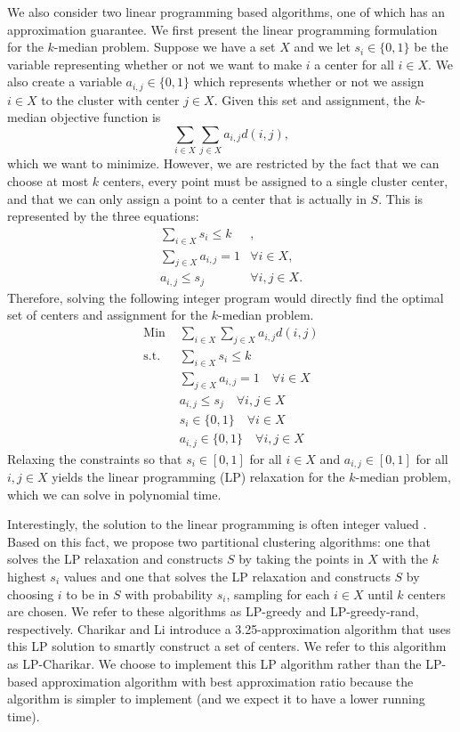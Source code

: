 \documentclass[conference, 10pt, final]{IEEEtran}
\begin{document}
We also consider two linear programming based algorithms, one of which has an approximation guarantee. We first present the linear programming formulation for the $k$-median problem. Suppose we have a set $X$ and we let $s_i \in \{0,1\}$ be the variable representing whether or not we want to make $i$ a center for all $i \in X$. We also create a variable $a_{i,j} \in \{0, 1\}$ which represents whether or not we assign $i \in X$ to the cluster with center $j \in X$. Given this set and assignment, the $k$-median objective function is 
\begin{equation}
\sum_{i \in X} \sum_{j \in X} a_{i,j} d(i,j), 
\end{equation}
which we want to minimize. However, we are restricted by the fact that we can choose at most $k$ centers, every point must be assigned to a single cluster center, and that we can only assign a point to a center that is actually in $S$. This is represented by the three equations:
\begin{eqnarray}
\sum_{i \in X} s_i   \leq k & ,\\
\sum_{j \in X} a_{i,j}  = 1 & \forall i \in X, \\
a_{i,j}   \leq s_j & \forall i, j \in X.
\end{eqnarray}
Therefore, solving the following integer program would directly find the optimal set of centers and assignment for the $k$-median problem.
\begin{eqnarray}
\text{Min } & \sum_{i \in X} \sum_{j \in X} a_{i,j} d(i,j) \\
\text{s.t. } & \sum_{i \in X} s_i   \leq k  \\
& \sum_{j \in X} a_{i,j}  = 1 \quad \forall i \in X \\
& a_{i,j}   \leq s_j \quad \forall i, j \in X \\
& s_i \in \{0,1\} \quad \forall i \in X \\
& a_{i,j} \in \{0,1\} \quad \forall i, j \in X
\end{eqnarray}
Relaxing the constraints so that $s_i \in [0,1]$ for all $i \in X$ and $a_{i,j} \in [0,1]$ for all $i,j \in X$ yields the linear programming (LP) relaxation for the $k$-median problem, which we can solve in polynomial time.

Interestingly, the solution to the linear programming is often integer valued \cite{Nagarajan}. Based on this fact, we propose two partitional clustering algorithms: one that solves the LP relaxation and constructs $S$ by taking the points in $X$ with the $k$ highest $s_i$ values and one that solves the LP relaxation and constructs $S$ by choosing $i$ to be in $S$ with probability $s_i$, sampling for each $i \in X$ until $k$ centers are chosen. We refer to these algorithms as LP-greedy and LP-greedy-rand, respectively.
Charikar and Li \cite{Charikar} introduce a 3.25-approximation algorithm that uses this LP solution to smartly construct a set of centers. We refer to this algorithm as LP-Charikar. We choose to implement this LP algorithm rather than the LP-based approximation algorithm with best approximation ratio because the algorithm is simpler to implement (and we expect it to have a lower running time). 
\end{document}
